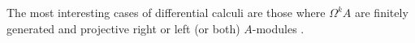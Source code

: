 \documentclass{amsart}
\newtheorem{proposition}[theorem]{Proposition}
\theoremstyle{definition}
\theoremstyle{remark}
\numberwithin{equation}{section}
\begin{document}




The most interesting cases of differential calculi are those where $\Omega^k A$ are finitely generated and projective right or left (or both) $A$-modules \cite{Brzezinski2011}.
\end{document}
